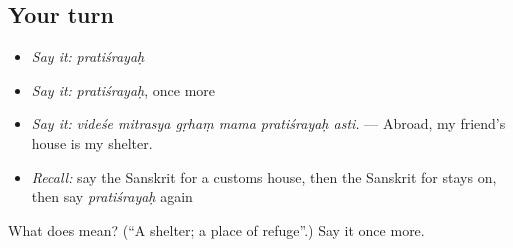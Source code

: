 \subsection*{Your turn}
\begin{itemize}
\raggedright
  \item \emph{Say it:} \emph{pratiśrayaḥ}
  \item \emph{Say it:} \emph{pratiśrayaḥ}, once more
  \item \emph{Say it:} \emph{videśe mitrasya gṛhaṃ mama pratiśrayaḥ asti.} — Abroad, my friend's house is my shelter.
  \item \emph{Recall:} say the Sanskrit for a customs house, then the Sanskrit for stays on, then say \emph{pratiśrayaḥ} again
\end{itemize}

\begin{tcolorbox}[breakable,colback=teal!4,colframe=teal!35!black,title={Before you move on}]
What does  mean? (\textquotedblleft{}A shelter; a place of refuge\textquotedblright{}.) Say it once more.
\end{tcolorbox}
